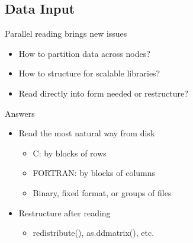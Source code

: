 \subsection{Data Input}

\begin{frame}
  \begin{block}{Parallel reading brings new issues}\pause
    \begin{itemize}
    \item How to partition data across nodes?
    \item How to structure for scalable libraries?
    \item Read directly into form needed or restructure?
    \end{itemize}
  \end{block}
  \begin{block}{Answers}\pause
    \begin{itemize}
    \item Read the most natural way from disk
      \begin{itemize}
      \item C: by blocks of rows
      \item FORTRAN: by blocks of columns
      \item Binary, fixed format, or groups of files
      \end{itemize}
    \item Restructure after reading
      \begin{itemize}
      \item redistribute(), as.ddmatrix(), etc.
      \end{itemize}
    \end{itemize}
  \end{block}
\end{frame}

